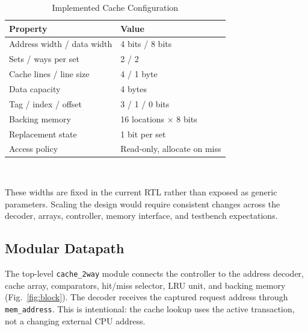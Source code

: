\documentclass[conference]{IEEEtran}
\begin{document}
\begin{table}[!t]
\caption{Implemented Cache Configuration}
\label{tab:config}
\centering
\begin{tabular}{ll}
\toprule
Property & Value \\
\midrule
Address width / data width & 4 bits / 8 bits \\
Sets / ways per set & 2 / 2 \\
Cache lines / line size & 4 / 1 byte \\
Data capacity & 4 bytes \\
Tag / index / offset & 3 / 1 / 0 bits \\
Backing memory & 16 locations $\times$ 8 bits \\
Replacement state & 1 bit per set \\
Access policy & Read-only, allocate on miss \\
\bottomrule
\end{tabular}
\\[4pt]
\parbox{0.95\columnwidth}{\footnotesize These widths are fixed in the
current RTL rather than exposed as generic parameters. Scaling the
design would require consistent changes across the decoder, arrays,
controller, memory interface, and testbench expectations.}
\end{table}

\subsection{Modular Datapath}

The top-level \texttt{cache\_2way} module connects the controller to
the address decoder, cache array, comparators, hit/miss selector, LRU
unit, and backing memory (Fig.~\ref{fig:block}). The decoder receives
the captured request address through \texttt{mem\_address}. This is
intentional: the cache lookup uses the active transaction, not a
changing external CPU address.
\end{document}
